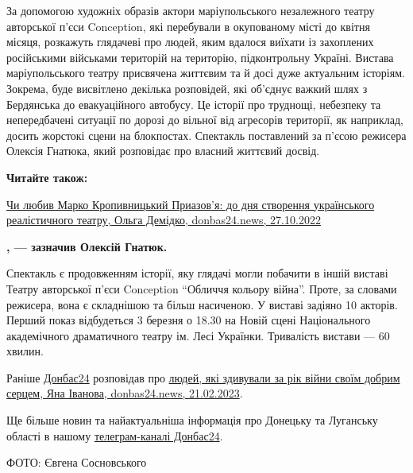 За допомогою художніх образів актори маріупольського незалежного театру
авторської п'єси Conception, які перебували в окупованому місті до квітня
місяця, розкажуть глядачеві про людей, яким вдалося виїхати із захоплених
російськими військами територій на територію, підконтрольну Україні. Вистава
маріупольського театру присвячена життєвим та й досі дуже актуальним історіям.
Зокрема, буде висвітлено декілька розповідей, які об'єднує важкий шлях з
Бердянська до евакуаційного автобусу. Це історії про труднощі, небезпеку та
непередбачені ситуації по дорозі до вільної від агресорів території, як
наприклад, досить жорстокі сцени на блокпостах. Спектакль поставлений за п'єсою
режисера Олексія Гнатюка, який розповідає про власний життєвий досвід.

\textbf{Читайте також:} 

\href{https://donbas24.news/news/ci-lyubiv-marko-kropivnickii-priazovya-do-dnya-stvorennya-ukrayinskogo-realisticnogo-teatru}{%
Чи любив Марко Кропивницький Приазов'я: до дня створення українського реалістичного театру, Ольга Демідко, donbas24.news, 27.10.2022}


\begin{leftbar}
	\begingroup
		\bfseries
{}, —
зазначив Олексій Гнатюк. 
	\endgroup
\end{leftbar}

Спектакль є продовженням історії, яку глядачі могли побачити в іншій виставі
Театру авторської п'єси Conception \enquote{Обличчя кольору війна}. Проте, за словами
режисера, вона є складнішою та більш насиченою. У виставі задіяно 10 акторів.
Перший показ відбудеться 3 березня о 18.30 на Новій сцені Національного
академічного драматичного театру ім. Лесі Українки. Тривалість вистави — 60
хвилин.

Раніше \href{https://donbas24.news}{Донбас24} розповідав про
\href{https://donbas24.news/news/lyudi-yaki-zdivuvali-za-rik-viini-svoyim-dobrim-sercem-foto}{%
людей, які здивували за рік війни своїм добрим серцем, Яна Іванова, %
donbas24.news, 21.02.2023}.

Ще більше новин та найактуальніша інформація про Донецьку та Луганську області
в нашому \href{https://t.me/donbas24}{телеграм-каналі Донбас24}.

ФОТО: Євгена Сосновського

